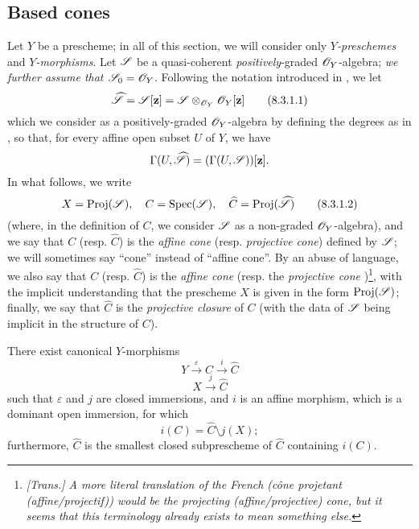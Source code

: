 \subsection{Based cones}
\label{subsection:II.8.3}

\begin{env}[8.3.1]
\label{II.8.3.1}
Let $Y$ be a prescheme;
in all of this section, we will consider only \emph{$Y$-preschemes} and \emph{$Y$-morphisms}.
Let $\mathscr{S}$ be a quasi-coherent \emph{positively}-graded $\mathscr{O}_Y$-algebra;
\emph{we further assume that $\mathscr{S}_0=\mathscr{O}_Y$}.
Following the notation introduced in , we let
\[
\label{II.8.3.1.1}
  \widehat{\mathscr{S}} = \mathscr{S}[\mathbf{z}] = \mathscr{S} \otimes_{\mathscr{O}_Y} \mathscr{O}_Y[\mathbf{z}]
\tag{8.3.1.1}
\]
which we consider as a positively-graded $\mathscr{O}_Y$-algebra by defining the degrees as in , so that, for every affine open subset $U$ of $Y$, we have
\[
  \Gamma(U,\widehat{\mathscr{S}}) = (\Gamma(U,\mathscr{S}))[\mathbf{z}].
\]
In what follows, we write
\[
\label{II.8.3.1.2}
  X = \operatorname{Proj}(\mathscr{S}),
  \quad
  C = \operatorname{Spec}(\mathscr{S}),
  \quad
  \widehat{C} = \operatorname{Proj}(\widehat{\mathscr{S}})
\tag{8.3.1.2}
\]
(where, in the definition of $C$, we consider $\mathscr{S}$ as a non-graded $\mathscr{O}_Y$-algebra), and we say that $C$ (resp. $\widehat{C}$) is the \emph{affine cone} (resp. \emph{projective cone}) defined by $\mathscr{S}$;
we will sometimes say ``cone'' instead of ``affine cone''.
By an abuse of language, we also say that $C$ (resp. $\widehat{C}$) is the \emph{affine cone } (resp. the \emph{projective cone })\footnote{\emph{[Trans.] A more literal translation of the French (\emph{c\^one projetant (affine/projectif)}) would be the \emph{projecting (affine/projective) cone}, but it seems that this terminology already exists to mean something else.}}, with the implicit understanding that the prescheme $X$ is given in the form $\operatorname{Proj}(\mathscr{S})$;
finally, we say that $\widehat{C}$ is the \emph{projective closure} of $C$ (with the data of $\mathscr{S}$ being implicit in the structure of $C$).
\end{env}

\begin{proposition}[8.3.2]
\label{II.8.3.2}
There exist canonical $Y$-morphisms
\[
\label{II.8.3.2.1}
  Y \xrightarrow{\varepsilon} C \xrightarrow{i} \widehat{C}
\tag{8.3.2.1}
\]
\[
\label{II.8.3.2.2}
  X \xrightarrow{j} \widehat{C}
\tag{8.3.2.2}
\]
such that $\varepsilon$ and $j$ are closed immersions, and $i$ is an affine morphism, which is a dominant open immersion, for which
\[
\label{II.8.3.2.3}
  i(C) = \widehat{C}\setminus j(X);
\tag{8.3.2.3}
\]
furthermore, $\widehat{C}$ is the smallest closed subprescheme of $\widehat{C}$ containing $i(C)$.
\end{proposition}

